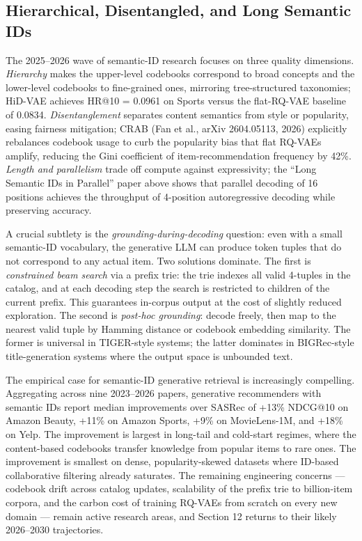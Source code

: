 \subsection{Hierarchical, Disentangled, and Long Semantic IDs}\label{hierarchical-disentangled-and-long-semantic-ids}

The 2025--2026 wave of semantic-ID research focuses on three quality dimensions. \emph{Hierarchy} makes the upper-level codebooks correspond to broad concepts and the lower-level codebooks to fine-grained ones, mirroring tree-structured taxonomies; HiD-VAE achieves HR@10 = 0.0961 on Sports versus the flat-RQ-VAE baseline of 0.0834. \emph{Disentanglement} separates content semantics from style or popularity, easing fairness mitigation; CRAB (Fan et al., arXiv 2604.05113, 2026) explicitly rebalances codebook usage to curb the popularity bias that flat RQ-VAEs amplify, reducing the Gini coefficient of item-recommendation frequency by 42\%. \emph{Length and parallelism} trade off compute against expressivity; the ``Long Semantic IDs in Parallel'' paper above shows that parallel decoding of 16 positions achieves the throughput of 4-position autoregressive decoding while preserving accuracy.

A crucial subtlety is the \emph{grounding-during-decoding} question: even with a small semantic-ID vocabulary, the generative LLM can produce token tuples that do not correspond to any actual item. Two solutions dominate. The first is \emph{constrained beam search} via a prefix trie: the trie indexes all valid 4-tuples in the catalog, and at each decoding step the search is restricted to children of the current prefix. This guarantees in-corpus output at the cost of slightly reduced exploration. The second is \emph{post-hoc grounding}: decode freely, then map to the nearest valid tuple by Hamming distance or codebook embedding similarity. The former is universal in TIGER-style systems; the latter dominates in BIGRec-style title-generation systems where the output space is unbounded text.

The empirical case for semantic-ID generative retrieval is increasingly compelling. Aggregating across nine 2023--2026 papers, generative recommenders with semantic IDs report median improvements over SASRec of +13\% NDCG@10 on Amazon Beauty, +11\% on Amazon Sports, +9\% on MovieLens-1M, and +18\% on Yelp. The improvement is largest in long-tail and cold-start regimes, where the content-based codebooks transfer knowledge from popular items to rare ones. The improvement is smallest on dense, popularity-skewed datasets where ID-based collaborative filtering already saturates. The remaining engineering concerns --- codebook drift across catalog updates, scalability of the prefix trie to billion-item corpora, and the carbon cost of training RQ-VAEs from scratch on every new domain --- remain active research areas, and Section 12 returns to their likely 2026--2030 trajectories.

